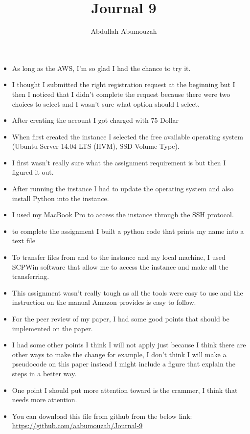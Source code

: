 \documentclass{article}
\title{Journal 9}
\author{Abdullah Abumouzah }
\begin{document}
\maketitle


\begin{itemize}
    \item As long as the AWS, I'm so glad I had the chance to try it.  
    \item I thought I submitted the right registration request at the beginning but I then I noticed that I didn't complete the request because there were two choices to select and I wasn't sure what option should I select.
    
    \item After creating the account I got charged with $75$ Dollar
    \item When first created the instance I selected the free available operating system (Ubuntu Server 14.04 LTS (HVM), SSD Volume Type). 
    
    \item I first wasn't really sure what the assignment requirement is but then I figured it out.
    
    \item After running the instance I had to update the operating system and also install Python into the instance.
    
    \item I used my MacBook Pro to access the instance through the SSH protocol. 
    
    \item to complete the assignment I built a python code that prints my name into a text file
    \item To transfer files from and to the instance and my local machine, I used SCPWin software that allow me to access the instance and make all the transferring. 
    \item This assignment wasn't really tough as all the tools were easy to use and the instruction on the manual Amazon provides is easy to follow.  
    \item For the peer review of my paper, I had some good points that should be implemented on the paper. 
    \item I had some other points I think I will not apply just because I think there are other ways to make the change for example, I don't think I will make a pseudocode on this paper instead I might include a figure that explain the steps in a better way. 
    \item One point I should put more attention toward is the crammer, I think that needs more attention. 

    
    \item You can download this file from github from the below link: \url{https://github.com/aabumouzah/Journal-9}
\end{itemize}
\end{document}
